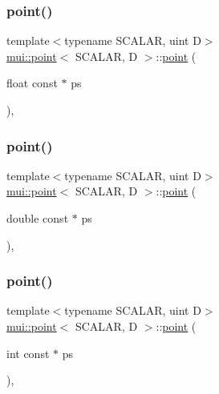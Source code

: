 \mbox{\label{structmui_1_1point_a563cec9439adfcc7e3113f648ed8639e}} 
\subsubsection{\texorpdfstring{point()}{point()}\hspace{0.1cm}{\footnotesize\ttfamily [8/15]}}
{\footnotesize\ttfamily template$<$typename S\+C\+A\+L\+AR, uint D$>$ \\
\hyperlink{structmui_1_1point}{mui\+::point}$<$ S\+C\+A\+L\+AR, D $>$\+::\hyperlink{structmui_1_1point}{point} (\begin{DoxyParamCaption}\item[{float const $\ast$}]{ps }\end{DoxyParamCaption})\hspace{0.3cm}{\ttfamily [inline]}, {\ttfamily [explicit]}}

\mbox{\label{structmui_1_1point_ac24536d40a20e4404fc98732b8ee2e29}} 
\subsubsection{\texorpdfstring{point()}{point()}\hspace{0.1cm}{\footnotesize\ttfamily [9/15]}}
{\footnotesize\ttfamily template$<$typename S\+C\+A\+L\+AR, uint D$>$ \\
\hyperlink{structmui_1_1point}{mui\+::point}$<$ S\+C\+A\+L\+AR, D $>$\+::\hyperlink{structmui_1_1point}{point} (\begin{DoxyParamCaption}\item[{double const $\ast$}]{ps }\end{DoxyParamCaption})\hspace{0.3cm}{\ttfamily [inline]}, {\ttfamily [explicit]}}

\mbox{\label{structmui_1_1point_a24a0c75188dca81e9edc0d69ba680236}} 
\subsubsection{\texorpdfstring{point()}{point()}\hspace{0.1cm}{\footnotesize\ttfamily [10/15]}}
{\footnotesize\ttfamily template$<$typename S\+C\+A\+L\+AR, uint D$>$ \\
\hyperlink{structmui_1_1point}{mui\+::point}$<$ S\+C\+A\+L\+AR, D $>$\+::\hyperlink{structmui_1_1point}{point} (\begin{DoxyParamCaption}\item[{int const $\ast$}]{ps }\end{DoxyParamCaption})\hspace{0.3cm}{\ttfamily [inline]}, {\ttfamily [explicit]}}

